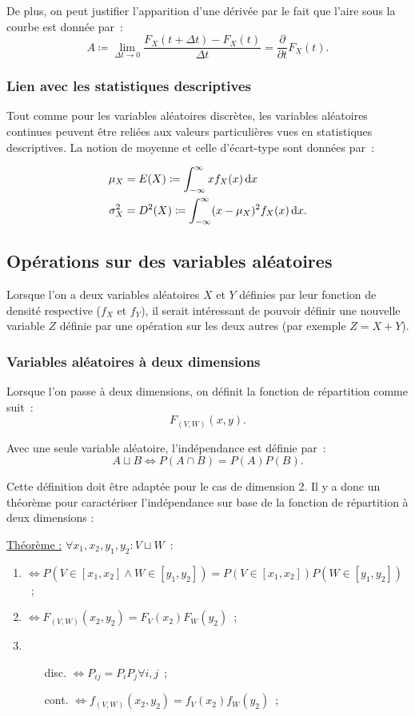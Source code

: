 \documentclass{article}
\renewcommand{\pd}[1]{\frac {\partial}{\partial #1}}
\begin{document}
			De plus, on peut justifier l'apparition d'une dérivée par le fait que l'aire sous la courbe est donnée par~:
			\[A \coloneqq \lim_{\Delta t \to 0}\frac {F_X(t + \Delta t) - F_X(t)}{\Delta t} = \pd{t}F_X(t).\]

		\subsubsection{Lien avec les statistiques descriptives}
			Tout comme pour les variables aléatoires discrètes, les variables aléatoires continues peuvent être reliées aux valeurs particulières vues en statistiques
			descriptives. La notion de moyenne et celle d'écart-type sont données par~:

			\begin{align}
				\mu_X &= E(X) \coloneqq \int_{-\infty}^\infty x f_X(x)\dif x \\
				\sigma_X^2 &= D^2(X) \coloneqq \int_{-\infty}^\infty(x-\mu_X)^2f_X(x)\dif x.
			\end{align}
	\subsection{Opérations sur des variables aléatoires}
		Lorsque l'on a deux variables aléatoires $X$ et $Y$ définies par leur fonction de densité respective ($f_X$ et $f_Y$), il serait intéressant de pouvoir définir
		une nouvelle variable $Z$ définie par une opération sur les deux autres (par exemple $Z = X+Y$).

		\subsubsection{Variables aléatoires à deux dimensions}
			Lorsque l'on passe à deux dimensions, on définit la fonction de répartition comme suit~:
			\[F_{(V, W)}(x, y).\]

			Avec une seule variable aléatoire, l'indépendance est définie par~:
			\[A \sqcup B \iff P(A \cap B) = P(A)P(B).\]

			Cette définition doit être adaptée pour le cas de dimension 2. Il y a donc un théorème pour caractériser l'indépendance sur base de la fonction de
			répartition à deux dimensions :

			\underline{Théorème :} $\forall x_1, x_2, y_1, y_2 : V \sqcup W$~:
			\begin{enumerate}
				\item $\iff P(V \in [x_1, x_2] \land W \in [y_1, y_2]) = P(V \in [x_1, x_2])P(W \in [y_1, y_2])$~;
				\item $\iff F_{(V, W)}(x_2, y_2) = F_V(x_2)F_W(y_2)$~;
				\item
					\begin{enumerate}
						\item[disc.] $\iff P_{ij} = P_iP_j \forall i, j$~;
						\item[cont.] $\iff f_{(V, W)}(x_2, y_2) = f_V(x_2)f_W(y_2)$~;
					\end{enumerate}
			\end{enumerate}
\end{document}
